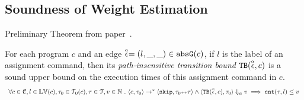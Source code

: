 \subsection{Soundness of Weight Estimation}
  \label{apdx:weight_soundness}
  Preliminary Theorem from paper~\cite{sinn2017complexity}.
  \begin{thm}
    \label{thm:transition_bound_sound}
  For each program ${c}$ and an edge $\stackrel{\scriptscriptstyle{\alpha}}{\mathtt{\epsilon}{}} = (l, \_, \_) \in \mathtt{abs}{\mathtt{G}}(c)$, if $l$ is the label of an assignment command,
  then its \emph{path-insensitive transition bound} ${\mathtt{TB}}(\stackrel{\scriptscriptstyle{\alpha}}{\mathtt{\epsilon}{}}, c)$ 
   is a sound upper bound on 
  the execution times of this assignment command in $c$.
    \[
      \begin{array}{l}
        \forall c \in \mathcal{C}, l \in \mathbb{LV}(c),\mathtt{\tau}_0 \in \mathcal{T}_0(c), 
        \mathtt{\tau} \in \mathcal{T}, v \in \mathbb{N}
         ~.~ 
         \langle {c}, \mathtt{\tau}_0 \rangle \to^{*} \langle \mathtt{skip}, \mathtt{\tau}_0{\scriptscriptstyle ++}\mathtt{\tau} \rangle 
         \land \langle {\ensuremath{\mathtt{TB}}}(\stackrel{\scriptscriptstyle{\alpha}}{\mathtt{\epsilon}{}}, c), \mathtt{\tau}_0 \rangle \Downarrow_a v
        \implies
        \mathtt{cnt}(\mathtt{\tau}, l) \leq v
      \end{array}
      \]
  \end{thm}

